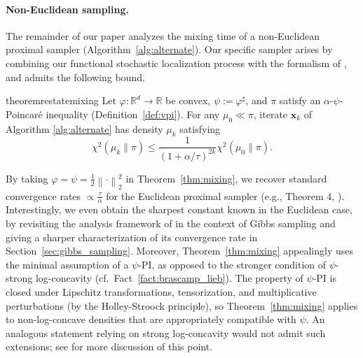 \documentclass[11pt]{article}
\newcommand{\defeq}{:=}
\newcommand{\norm}[1]{\left\lVert#1\right\rVert}
\newcommand{\R}{\mathbb{R}}
\newcommand{\half}{\frac{1}{2}}
\newcommand{\0}{\mathbf{0}}
\newcommand{\1}{\mathbf{1}}
\newcommand{\vx}{\mathbf{x}}
\newcommand{\vhi}{\varphi}
\begin{document}
\paragraph{Non-Euclidean sampling.} The remainder of our paper analyzes the mixing time of a non-Euclidean proximal sampler (Algorithm~\ref{alg:alternate}). Our specific sampler arises by combining our functional stochastic localization process with the formalism of \cite{ChenE22}, and admits the following bound.

\begin{restatable}{theorem}{restatemixing}\label{thm:mixing}
Let $\vhi: \R^d \to \R$ be convex, $\psi \defeq \vhi^\sharp$, and $\pi$ satisfy an $\alpha$-$\psi$-Poincar\'e inequality (Definition~\ref{def:vpi}).  For any $\mu_0\ll \pi$, iterate $\vx_k$ of Algorithm \ref{alg:alternate} has density $\mu_k$ satisfying
    \begin{equation}\label{eq:convergence_result}
        \chi^2(\mu_k \|\pi) \le \frac{1}{(1 + \alpha/\tau)^{2k}}\chi^2(\mu_0\|\pi).
    \end{equation}
\end{restatable}

By taking $\vhi = \psi = \half\norm{\cdot}_2^2$ in Theorem~\ref{thm:mixing}, we recover standard convergence rates $\propto \frac \tau \alpha$ for the Euclidean proximal sampler (e.g., Theorem 4, \cite{ChenCSW22}). Interestingly, we  even obtain the sharpest constant known in the Euclidean case, by revisiting the analysis framework of \cite{ChenE22} in the context of Gibbs sampling and giving a sharper characterization of its convergence rate in Section~\ref{sec:gibbs_sampling}. Moreover, Theorem~\ref{thm:mixing} appealingly uses the minimal assumption of a $\psi$-PI, as opposed to the stronger condition of $\psi$-strong log-concavity (cf.\ Fact~\ref{fact:brascamp_lieb}). The property of $\psi$-PI is closed under Lipschitz transformations, tensorization, and  multiplicative perturbations (by the Holley-Stroock principle), so Theorem~\ref{thm:mixing} applies to non-log-concave densities that are appropriately compatible with $\psi$. An analogous statement relying on strong log-concavity would not admit such extensions; see \cite{VempalaW19,Chewi23} for more discussion of this point.  
\end{document}
